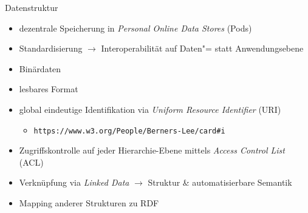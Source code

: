 \begin{frame}{Datenstruktur}
    \begin{itemize}
        \item dezentrale Speicherung in \emph{Personal Online Data Stores} (Pods)~\cite{mecklerWebLinkedData2023,sambraSolidPlatformDecentralized2016}
        \item Standardisierung $\to$ Interoperabilität auf Daten"= statt Anwendungsebene
        
        \item Binärdaten 
        
        \pause
        \pause
        \item lesbares Format 
        
        \pause
        \pause
        \item global eindeutige Identifikation via \emph{Uniform Resource Identifier} (URI)~\cite{sambraSolidPlatformDecentralized2016}
        \begin{itemize}
            \item \texttt{https://www.w3.org/People/Berners-Lee/card\#i}~\cite{bizerLinkedDataStory2009}
        \end{itemize}
        
        \pause
        \item Zugriffskontrolle auf jeder Hierarchie-Ebene mittels \emph{Access Control List} (ACL)
        
        \pause
        \item Verknüpfung via \emph{Linked Data} $\to$ Struktur \& automatisierbare Semantik~\cite{bizerLinkedDataStory2009,mecklerWebLinkedData2023}
        
        \pause
        \item Mapping anderer Strukturen zu RDF~\cite{mecklerWebLinkedData2023,sambraSolidPlatformDecentralized2016}
    \end{itemize}
\end{frame}

